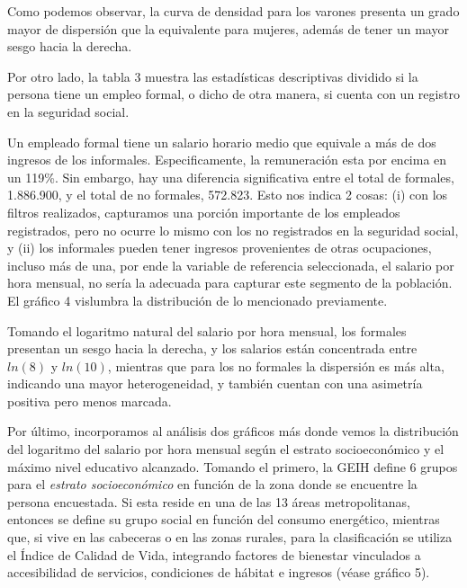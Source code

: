 \documentclass[11pt,oneside]{article}
\begin{document}
	
	Como podemos observar, la curva de densidad para los varones presenta un grado mayor de dispersión que la equivalente para mujeres, además de tener un mayor sesgo hacia la derecha.
	
	Por otro lado, la tabla 3 muestra las estadísticas descriptivas dividido si la persona tiene un empleo formal, o dicho de otra manera, si cuenta con un registro en la seguridad social.
	
	
	Un empleado formal tiene un salario horario medio que equivale a más de dos ingresos de los informales. Especificamente, la remuneración esta por encima en un 119\%. Sin embargo, hay una diferencia significativa entre el total de formales, 1.886.900, y el total de no formales, 572.823. Esto nos indica 2 cosas: (i) con los filtros realizados, capturamos una porción importante de los empleados registrados, pero no ocurre lo mismo con los no registrados en la seguridad social, y (ii) los informales pueden tener ingresos provenientes de otras ocupaciones, incluso más de una, por ende la variable de referencia seleccionada, el salario por hora mensual, no sería la adecuada para capturar este segmento de la población. El gráfico 4 vislumbra la distribución de lo mencionado previamente. 
	
	
	Tomando el logaritmo natural del salario por hora mensual, los formales presentan un sesgo hacia la derecha, y los salarios están concentrada entre $ln(8)$ y $ln(10)$, mientras que para los no formales la dispersión es más alta, indicando una mayor heterogeneidad, y también cuentan con una asimetría positiva pero menos marcada.
	
	Por último, incorporamos al análisis dos gráficos más donde vemos la distribución del logaritmo del salario por hora mensual según el estrato socioeconómico y el máximo nivel educativo alcanzado. Tomando el primero, la GEIH define 6 grupos para el \textit{estrato socioeconómico} en función de la zona donde se encuentre la persona encuestada. Si esta reside en una de las 13 áreas metropolitanas, entonces se define su grupo social en función del consumo energético, mientras que, si vive en las cabeceras o en las zonas rurales, para la clasificación se utiliza el Índice de Calidad de Vida, integrando factores de bienestar vinculados a accesibilidad de servicios, condiciones de hábitat e ingresos (véase gráfico 5).
	
\end{document}
